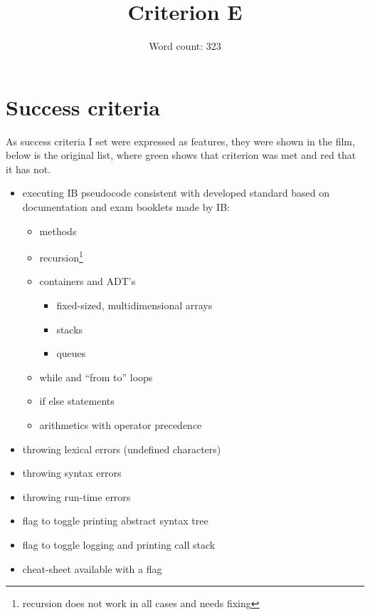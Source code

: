 \documentclass[12pt]{article}
\title{Criterion E}
\author{Word count: 323}
\date{}
\begin{document}
\maketitle

\section{Success criteria}

    As success criteria I set were expressed as features, they were shown in the
    film, below is the original list, where green shows that criterion was met 
    and red that it has not.
    \begin{itemize}
        \color{ForestGreen}
        \item executing IB pseudocode consistent with developed 
            standard based on documentation and exam booklets made by IB:
            \begin{itemize}
                \item methods
                \color{Orange}
                \item recursion\footnote{recursion does not work in all cases and needs fixing}
                \color{ForestGreen}
                \item containers and ADT's
                    \begin{itemize}
                        \item fixed-sized, multidimensional arrays
                        \item stacks 
                        \item queues
                    \end{itemize}
                \item while and ``from to'' loops
                \item if else statements
                \item arithmetics with operator precedence
            \end{itemize}
        \item throwing lexical errors (undefined characters)
        \item throwing syntax errors
        \item throwing run-time errors
        \item flag to toggle printing abstract syntax tree
        \item flag to toggle logging and printing call stack
        \color{RubineRed}
        \item cheat-sheet available with a flag
    \end{itemize}
\end{document}
